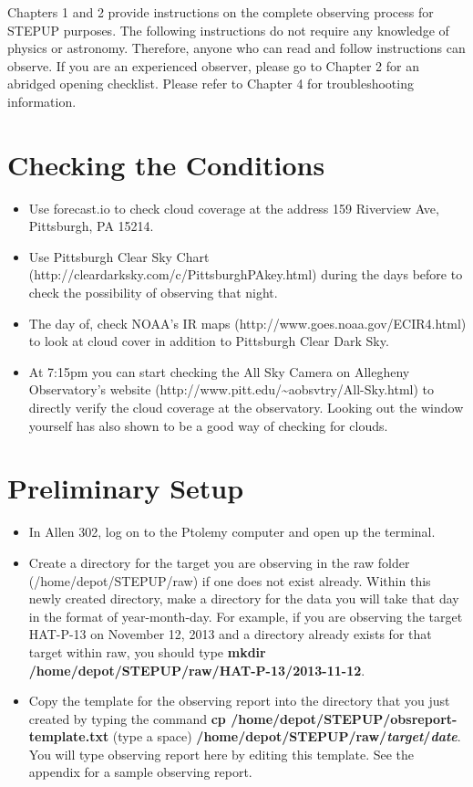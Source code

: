 \documentclass[11pt]{report}
\begin{document}
Chapters 1 and 2 provide instructions on the complete observing process for STEPUP purposes. The following instructions do not require any knowledge of physics or astronomy. Therefore, anyone who can read and follow instructions can observe. If you are an experienced observer, please go to Chapter 2 for an abridged opening checklist. Please refer to Chapter 4 for troubleshooting information.

\section{Checking the Conditions}

\begin{itemize}
\item Use forecast.io to check cloud coverage at the address 159 Riverview Ave, Pittsburgh, PA 15214.
\item Use Pittsburgh Clear Sky Chart (http://cleardarksky.com/c/PittsburghPAkey.html) during the days before to check the possibility of observing that night. 
\item The day of, check NOAA's IR maps (http://www.goes.noaa.gov/ECIR4.html) to look at cloud cover in addition to Pittsburgh Clear Dark Sky.
\item At 7:15pm you can start checking the All Sky Camera on Allegheny Observatory's website (http://www.pitt.edu/{\textasciitilde}aobsvtry/All-Sky.html) to directly verify the cloud coverage at the observatory. Looking out the window yourself has also shown to be a good way of checking for clouds.
\end{itemize}

\section{Preliminary Setup}

\begin{itemize}
\item In Allen 302, log on to the Ptolemy computer and open up the terminal.
\item Create a directory for the target you are observing in the raw folder (/home/depot/STEPUP/raw) if one does not exist already. Within this newly created directory, make a directory for the data you will take that day in the format of year-month-day. For example, if you are observing the target HAT-P-13 on November 12, 2013 and a directory already exists for that target within raw, you should type {\bf mkdir /home/depot/STEPUP/raw/HAT-P-13/2013-11-12\bf}.
\item Copy the template for the observing report into the directory that you just created by typing the command {\bf cp /home/depot/STEPUP/obsreport-template.txt\bf} (type a space) {\bf /home/depot/STEPUP/raw/\emph{target}/\emph{date}\bf}. You will type observing report here by editing this template. See the appendix for a sample observing report.
\end{itemize}
	
\end{document}

